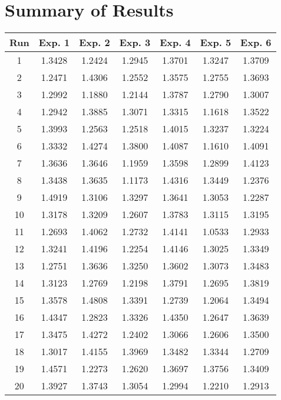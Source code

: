 \chapter{Summary of Results}

\begin{table}
	\centering
	\begin{tabular}{ | c | c | c | c | c | c | c | }
		\hline
		Run & Exp. 1 & Exp. 2 & Exp. 3 & Exp. 4 & Exp. 5 & Exp. 6 \\ \hline
		1 & 1.3428 & 1.2424 & 1.2945 & 1.3701 & 1.3247 & 1.3709 \\ \hline
		2 & 1.2471 & 1.4306 & 1.2552 & 1.3575 & 1.2755 & 1.3693 \\ \hline
		3 & 1.2992 & 1.1880 & 1.2144 & 1.3787 & 1.2790 & 1.3007 \\ \hline
		4 & 1.2942 & 1.3885 & 1.3071 & 1.3315 & 1.1618 & 1.3522 \\ \hline
		5 & 1.3993 & 1.2563 & 1.2518 & 1.4015 & 1.3237 & 1.3224 \\ \hline
		6 & 1.3332 & 1.4274 & 1.3800 & 1.4087 & 1.1610 & 1.4091 \\ \hline
		7 & 1.3636 & 1.3646 & 1.1959 & 1.3598 & 1.2899 & 1.4123 \\ \hline
		8 & 1.3438 & 1.3635 & 1.1173 & 1.4316 & 1.3449 & 1.2376 \\ \hline
		9 & 1.4919 & 1.3106 & 1.3297 & 1.3641 & 1.3053 & 1.2287 \\ \hline
		10 & 1.3178 & 1.3209 & 1.2607 & 1.3783 & 1.3115 & 1.3195 \\ \hline
		11 & 1.2693 & 1.4062 & 1.2732 & 1.4141 & 1.0533 & 1.2933 \\ \hline
		12 & 1.3241 & 1.4196 & 1.2254 & 1.4146 & 1.3025 & 1.3349 \\ \hline
		13 & 1.2751 & 1.3636 & 1.3250 & 1.3602 & 1.3073 & 1.3483 \\ \hline
		14 & 1.3123 & 1.2769 & 1.2198 & 1.3791 & 1.2695 & 1.3819 \\ \hline
		15 & 1.3578 & 1.4808 & 1.3391 & 1.2739 & 1.2064 & 1.3494 \\ \hline
		16 & 1.4347 & 1.2823 & 1.3326 & 1.4350 & 1.2647 & 1.3639 \\ \hline
		17 & 1.3475 & 1.4272 & 1.2402 & 1.3066 & 1.2606 & 1.3500 \\ \hline
		18 & 1.3017 & 1.4155 & 1.3969 & 1.3482 & 1.3344 & 1.2709 \\ \hline
		19 & 1.4571 & 1.2273 & 1.2620 & 1.3697 & 1.3756 & 1.3409 \\ \hline
		20 & 1.3927 & 1.3743 & 1.3054 & 1.2994 & 1.2210 & 1.2913 \\ \hline

\end{tabular}
\end{table}
